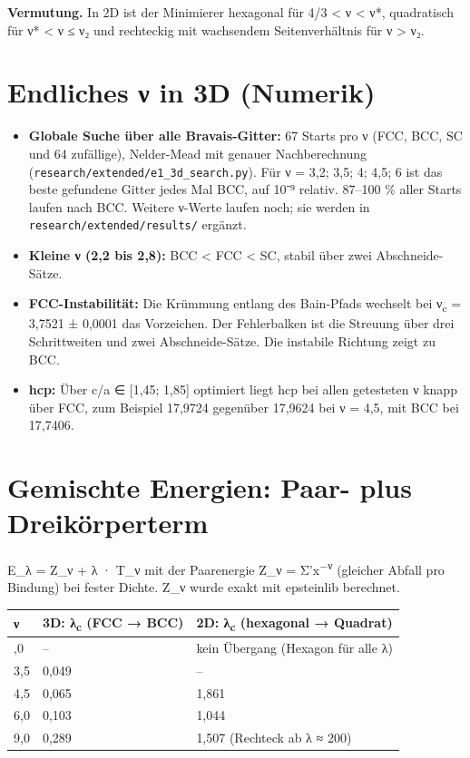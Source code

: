 \textbf{Vermutung.} In 2D ist der Minimierer hexagonal für 4/3 \textless{} ν \textless{} ν*, quadratisch für ν* \textless{} ν ≤ ν₂ und rechteckig mit wachsendem Seitenverhältnis für ν \textgreater{} ν₂.

\section{Endliches ν in 3D (Numerik)}

\begin{itemize}
\tightlist
\item
  \textbf{Globale Suche über alle Bravais-Gitter:} 67 Starts pro ν (FCC, BCC, SC und 64 zufällige), Nelder-Mead mit genauer Nachberechnung (\texttt{research/extended/e1\_3d\_search.py}). Für ν = 3,2; 3,5; 4; 4,5; 6 ist das beste gefundene Gitter jedes Mal BCC, auf 10⁻⁹ relativ. 87--100 \% aller Starts laufen nach BCC. Weitere ν-Werte laufen noch; sie werden in \texttt{research/extended/results/} ergänzt.
\item
  \textbf{Kleine ν (2,2 bis 2,8):} BCC \textless{} FCC \textless{} SC, stabil über zwei Abschneide-Sätze.
\item
  \textbf{FCC-Instabilität:} Die Krümmung entlang des Bain-Pfads wechselt bei ν\textsubscript{c} = 3,7521 ± 0,0001 das Vorzeichen. Der Fehlerbalken ist die Streuung über drei Schrittweiten und zwei Abschneide-Sätze. Die instabile Richtung zeigt zu BCC.
\item
  \textbf{hcp:} Über c/a ∈ {[}1,45; 1,85{]} optimiert liegt hcp bei allen getesteten ν knapp über FCC, zum Beispiel 17,9724 gegenüber 17,9624 bei ν = 4,5, mit BCC bei 17,7406.
\end{itemize}

\section{Gemischte Energien: Paar- plus Dreikörperterm}

E\_λ = Z\_ν + λ · T\_ν mit der Paarenergie Z\_ν = Σ'\textbar x\textbar{}\textsuperscript{−ν} (gleicher Abfall pro Bindung) bei fester Dichte. Z\_ν wurde exakt mit epsteinlib berechnet.

\begin{longtable}[]{@{}lll@{}}
\toprule\noalign{}
ν & 3D: λ\textsubscript{c} (FCC → BCC) & 2D: λ\textsubscript{c} (hexagonal → Quadrat) \\
\midrule\noalign{}
\endhead
\bottomrule\noalign{}
\endlastfoot
3,0 & -- & kein Übergang (Hexagon für alle λ) \\
3,5 & 0,049 & -- \\
4,5 & 0,065 & 1,861 \\
6,0 & 0,103 & 1,044 \\
9,0 & 0,289 & 1,507 (Rechteck ab λ ≈ 200) \\
\end{longtable}

